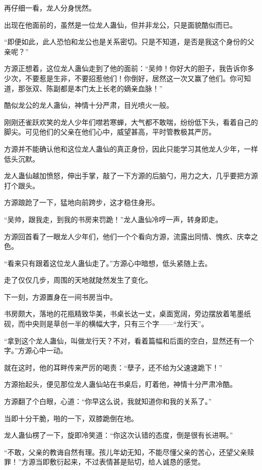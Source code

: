
\begin{this_body}

再仔细一看，龙人分身恍然。

出现在他面前的，虽然是一位龙人蛊仙，但并非龙公，只是面貌酷似而已。

“即便如此，此人恐怕和龙公也是关系密切。只是不知道，是否是我这个身份的父亲呢？”

方源正想着，这位龙人蛊仙走到了他的面前：“吴帅！你好大的胆子，我告诉你多少次，不要惹是生非，不要招惹他们！你倒好，居然这一次又赢了他们。你可知道，那张双、陈副都是本门太上长老的嫡亲血脉！”

酷似龙公的龙人蛊仙，神情十分严肃，目光喷火一般。

刚刚还雀跃欢笑的龙人少年们噤若寒蝉，大气都不敢喘，纷纷低下头，看着自己的脚尖。可见他们的父亲在他们心中，威望甚高，平时管教极其严厉。

方源并不能确认他和这位龙人蛊仙的真正身份，因此只能学习其他龙人少年，一样低头沉默。

龙人蛊仙越加愤怒，伸出手掌，敲了一下方源的后脑勺，用力之大，几乎要把方源打个跟头。

方源踉跄了一下，猛地向前跨步，这才稳住身形。

“吴帅，跟我走，到我的书房来罚跪！”龙人蛊仙冷哼一声，转身即走。

方源回首看了一眼龙人少年们，他们一个个看向方源，流露出同情、愧疚、庆幸之色。

“看来只有跟着这位龙人蛊仙走了。”方源心中暗想，低头紧随上去。

走了仅仅几步，周围的天地就陡然发生了变化。

下一刻，方源置身在一间书房当中。

书房颇大，落地的花瓶精致华美，书桌长达一丈，桌面宽阔，旁边摆放着笔墨纸砚，而中央则是草创一半的横幅大字，只有三个字——“龙行天”。

“拿到这个龙人蛊仙，叫做龙行天？不对，看着篇幅和后面的空白，显然还有一个字。”方源心中一动。

就在这时，他的耳畔传来严厉的喝责：“孽子，还不给为父速速跪下！”

方源抬起头，便见那位龙人蛊仙站在书桌后，盯着他，神情十分严肃冷酷。

方源翻了个白眼，心道：“你早这么说，我就知道你和我的关系了。”

当即十分干脆，啪的一下，双膝跪倒在地。

龙人蛊仙楞了一下，旋即冷笑道：“你这次认错的态度，倒是很有长进啊。”

“不敢，父亲的教诲自然有理。孩儿年幼无知，不能尽懂父亲的苦心，还望父亲赎罪！”方源当即敷衍起来，不过表情甚是贴切，给人诚恳的感觉。


\end{this_body}
